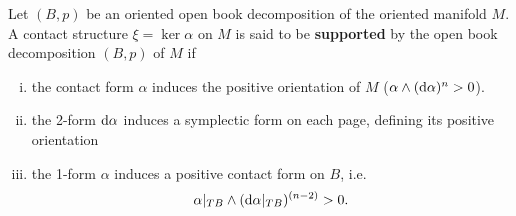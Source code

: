 \begin{definition}\label{def:support}
    Let $(B,p)$ be an oriented open book decomposition of the oriented manifold $M$.
    A contact structure $\xi = \ker \alpha$ on $M$ is said to be \textbf{supported} by the open book decomposition $(B,p)$ of $M$ if
    \begin{enumerate}[(i)]
        \item the contact form $\alpha$ induces the positive orientation of $M$ ($\alpha \wedge (\mathrm{d} \alpha)^n > 0$).
        \item the 2-form $\mathrm{d} \alpha$ induces a symplectic form on each page, defining its positive orientation
        \item the 1-form $\alpha$ induces a positive contact form on $B$, i.e. 
        \[ 
            \alpha|_{TB} \wedge (\mathrm{d} \alpha|_{TB})^{(n-2)} > 0.
        \]
    \end{enumerate}
\end{definition}

